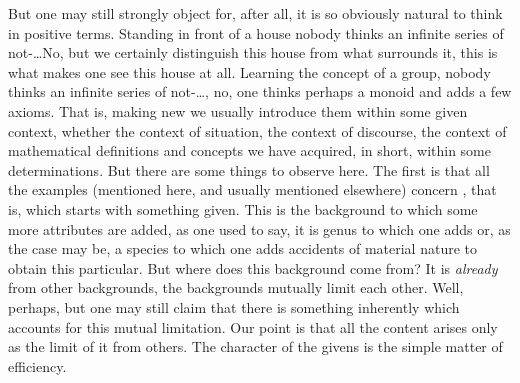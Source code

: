 \pa\label{pa:pragmaticPositive} But one may still strongly object for, after
all, it is so obviously natural to think in positive terms. Standing in front of
a house nobody thinks an infinite series of not-\ldots No, but we certainly
distinguish this house from what surrounds it, this is what makes one see this
house at all. Learning the concept of a group, nobody thinks an infinite series
of not-\ldots, no, one thinks perhaps a monoid and adds a few axioms. That is,
making new  we usually introduce them within some given
context, whether the context of  situation, the context of discourse,
the context of mathematical definitions and concepts we have acquired, in short,
within some  determinations. But there are some things to observe
here. The first is that all the examples (mentioned here, and usually mentioned
elsewhere) concern , that is, 
which starts with something given. This  is the
 background to which some more  attributes are
added, as one used to say, it is genus to which one adds  or, as the case may be, a species to which one adds accidents of
material nature to obtain this particular. But where does this 
background come from? It is {\em already}  from other
 backgrounds, the  backgrounds mutually limit each
other. Well, perhaps, but one may still claim that there is something inherently
 which accounts for this mutual limitation. Our point is that all
the  content arises only as the limit of  it
from others. The  character of the givens is the simple matter of
efficiency.

